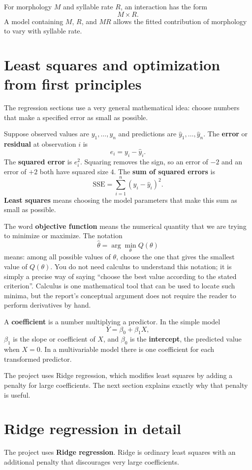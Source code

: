 \documentclass[11pt]{article}
\begin{document}
For morphology $M$ and syllable rate $R$, an interaction has the form
\[
M\times R.
\]
A model containing $M$, $R$, and $MR$ allows the fitted contribution of morphology to vary with syllable rate.

\newpage
\section{Least squares and optimization from first principles}
The regression sections use a very general mathematical idea: choose numbers that make a specified error as small as possible.

Suppose observed values are $y_1,\ldots,y_n$ and predictions are $\hat y_1,\ldots,\hat y_n$. The \textbf{error} or \textbf{residual} at observation $i$ is
\[
e_i=y_i-\hat y_i.
\]
The \textbf{squared error} is $e_i^2$. Squaring removes the sign, so an error of $-2$ and an error of $+2$ both have squared size $4$. The \textbf{sum of squared errors} is
\[
\mathrm{SSE}=\sum_{i=1}^n(y_i-\hat y_i)^2.
\]
\textbf{Least squares} means choosing the model parameters that make this sum as small as possible.

The word \textbf{objective function} means the numerical quantity that we are trying to minimize or maximize. The notation
\[
\hat\theta=\arg\min_\theta Q(\theta)
\]
means: among all possible values of $\theta$, choose the one that gives the smallest value of $Q(\theta)$. You do not need calculus to understand this notation; it is simply a precise way of saying ``choose the best value according to the stated criterion''. Calculus is one mathematical tool that can be used to locate such minima, but the report's conceptual argument does not require the reader to perform derivatives by hand.

A \textbf{coefficient} is a number multiplying a predictor. In the simple model
\[
Y=\beta_0+\beta_1X,
\]
$\beta_1$ is the slope or coefficient of $X$, and $\beta_0$ is the \textbf{intercept}, the predicted value when $X=0$. In a multivariable model there is one coefficient for each transformed predictor.

The project uses Ridge regression, which modifies least squares by adding a penalty for large coefficients. The next section explains exactly why that penalty is useful.

\section{Ridge regression in detail}
The project uses \textbf{Ridge regression}. Ridge is ordinary least squares with an additional penalty that discourages very large coefficients.
\end{document}

